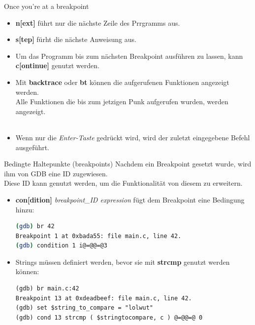 
\begin{frame}{Once you're at a breakpoint}
	\begin{itemize}
		\item \textbf{n[ext]} f\"uhrt nur die nächste Zeile des Prrgramms aus.
		\item \textbf{s[tep]} f\"urht die nächste Anweisung aus.
		\item Um das Programm bis zum n\"achsten Breakpoint ausführen zu lassen, kann \textbf{c[ontinue]} genutzt werden.
		\item Mit \textbf{backtrace} oder \textbf{bt} k\"onnen die aufgerufenen Funktionen angezeigt werden.\\
		Alle Funktionen die bis zum jetzigen Punk aufgerufen wurden, werden angezeigt.
		\\\ \\
		\item Wenn nur die \textit{Enter-Taste} gedrückt wird, wird der zuletzt eingegebene Befehl ausgeführt.
	\end{itemize}
\end{frame}


\begin{frame}[fragile]{Bedingte Haltepunkte (breakpoints)}
Nachdem ein Breakpoint gesetzt wurde, wird ihm von GDB eine ID zugewiesen.\\
Diese ID kann genutzt werden, um die Funktionalit\"at von diesem zu erweitern.
	\begin{itemize}
		\item \textbf{con[dition]} \textit{breakpoint\_ID expression} f\"ugt dem Breakpoint eine Bedingung hinzu:
		\begin{lstlisting}[numbers=none,language=bash]
(gdb) br 42
Breakpoint 1 at 0xbada55: file main.c, line 42.
(gdb) condition 1 i@=@@=@3
\end{lstlisting}
		\item Strings m\"ussen definiert werden, bevor sie mit \textbf{strcmp} genutzt werden k\"onnen:
		\begin{lstlisting}
(gdb) br main.c:42
Breakpoint 13 at 0xdeadbeef: file main.c, line 42.
(gdb) set $string_to_compare = "lolwut"
(gdb) cond 13 strcmp ( $stringtocompare, c ) @=@@=@ 0
\end{lstlisting}
	\end{itemize}
\end{frame}

